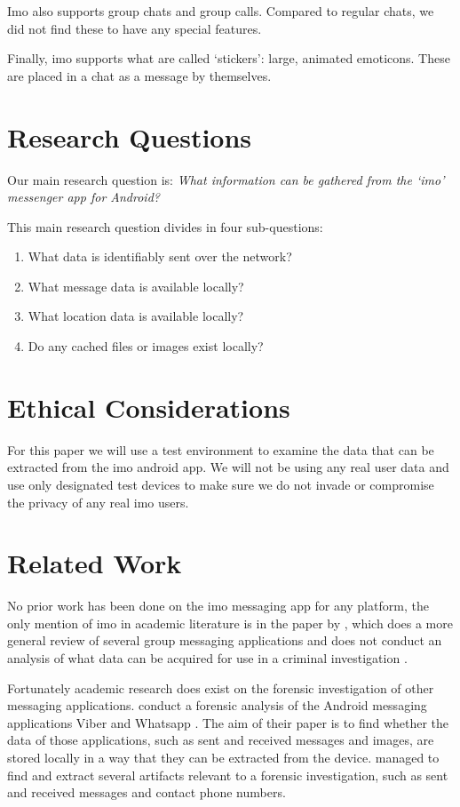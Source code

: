 \documentclass[conference]{IEEEtran}
\begin{document}
Imo also supports group chats and group calls. Compared to regular chats, we
did not find these to have any special features.

Finally, imo supports what are called `stickers': large, animated emoticons.
These are placed in a chat as a message by themselves.


\section{Research Questions}\label{sec:researchq}

Our main research question is:
{\it What information can be gathered from the `imo' messenger app for Android?}

This main research question divides in four sub-questions:

\begin{enumerate}
    \item What data is identifiably sent over the network?
    \item What message data is available locally?
    \item What location data is available locally?
    \item Do any cached files or images exist locally?
\end{enumerate}


\section{Ethical Considerations}\label{sec:ethics}

For this paper we will use a test environment to examine the data that can be
extracted from the imo android app. We will not be using any real user data and
use only designated test devices to make sure we do not invade or compromise the
privacy of any real imo users.


\section{Related Work}\label{sec:relwork}

No prior work has been done on the imo messaging app for any platform, the only
mention of imo in academic literature is in the paper by \citeauthor{zhu}, which
does a more general review of several group messaging applications and does not
conduct an analysis of what data can be acquired for use in a criminal
investigation \cite{zhu}.

Fortunately academic research does exist on the forensic investigation of other
messaging applications. \citeauthor{mahajan2013forensic} conduct a forensic
analysis of the Android messaging applications Viber and Whatsapp
\cite{mahajan2013forensic}. The aim of their paper is to find whether the data
of those applications, such as sent and received messages and images, are stored
locally in a way that they can be extracted from the device.
\citeauthor{mahajan2013forensic} managed to find and extract several artifacts
relevant to a forensic investigation, such as sent and received messages and
contact phone numbers.
\end{document}
